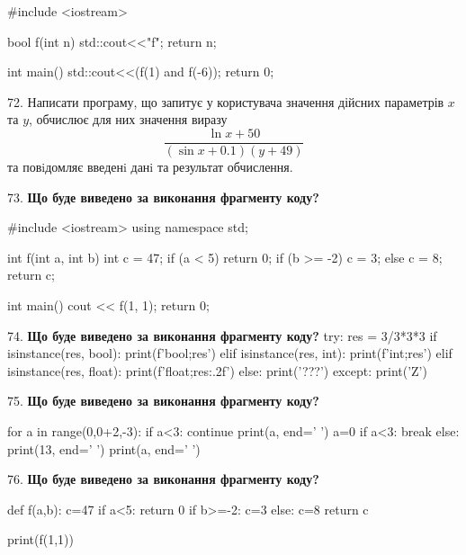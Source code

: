 \documentclass[11pt]{article}
\begin{document}
#include <iostream>

bool f(int n){
    std::cout<<"f";
    return n;
}

int main(){
    std::cout<<(f(1) and f(-6));
    return 0;
}
\par\vspace{5mm}

72. 
Написати програму, що запитує у користувача значення дійсних параметрів $x$ та $y$, обчислює для них значення виразу 
$$\frac{\ln x + 50}{(\sin x + 0.1) (y + 49)}$$ 
та повiдомляє введенi данi та результат обчислення.

\par\vspace{5mm}

73. \textbf{Що буде виведено за виконання фрагменту коду?}

#include <iostream>
using namespace std;

int f(int a, int b){
    int c = 47;
    if (a < 5)
        return 0;
    if (b >= -2)
         c = 3;
    else 
        c = 8;
    return c;
}

int main(){
    cout << f(1, 1);
    return 0;
}
\par\vspace{5mm}

74. \textbf{Що буде виведено за виконання фрагменту коду?}
try:
    res = 3/3*3*3
    if isinstance(res, bool):
        print(f'bool;{res}')
    elif isinstance(res, int):
        print(f'int;{res}')
    elif isinstance(res, float):
        print(f'float;{res:.2f}')
    else:
        print('???')
except:
    print('Z')
\par\vspace{5mm}

75. \textbf{Що буде виведено за виконання фрагменту коду?}

for a in range(0,0+2,-3):
    if a<3:
        continue
    print(a, end=' ')
    a=0
    if a<3:
        break
else:
    print(13, end=' ')
print(a, end=' ')
\par\vspace{5mm}

76. \textbf{Що буде виведено за виконання фрагменту коду?}

def f(a,b):
    c=47
    if a<5:
        return 0
    if b>=-2:
         c=3
    else: 
        c=8
    return c

print(f(1,1))\par\vspace{5mm}
\end{document}
